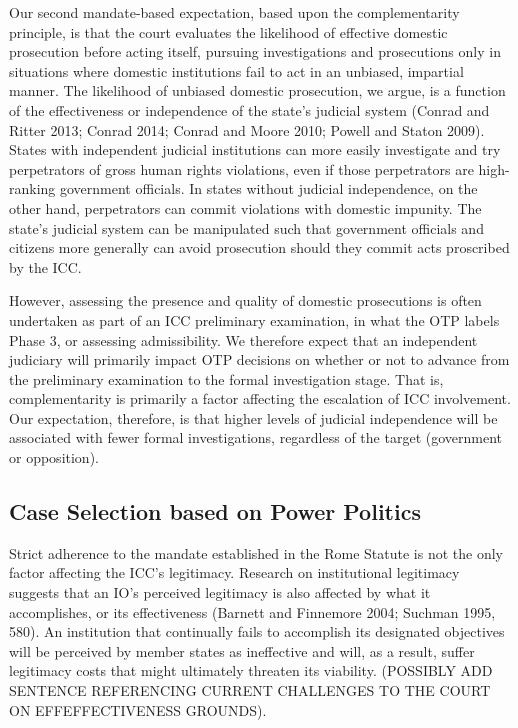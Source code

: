 Our second mandate-based expectation, based upon the complementarity principle, is that the court evaluates the likelihood of effective domestic prosecution before acting itself, pursuing investigations and prosecutions only in situations where domestic institutions fail to act in an unbiased, impartial manner. The likelihood of unbiased domestic prosecution, we argue, is a function of the effectiveness or independence of the state's judicial system (Conrad and Ritter 2013; Conrad 2014; Conrad and Moore 2010; Powell and Staton 2009). States with independent judicial institutions can more easily investigate and try perpetrators of gross human rights violations, even if those perpetrators are high-ranking government officials. In states without judicial independence, on the other hand, perpetrators can commit violations with domestic impunity. The state's judicial system can be manipulated such that government officials and citizens more generally can avoid prosecution should they commit acts proscribed by the ICC.  

However, assessing the presence and quality of domestic prosecutions is often undertaken as part of an ICC preliminary examination, in what the OTP labels Phase 3, or assessing admissibility.  We therefore expect that an independent judiciary will primarily impact OTP decisions on whether or not to advance from the preliminary examination to the formal investigation stage.  That is, complementarity is primarily a factor affecting the escalation of ICC involvement.  Our expectation, therefore, is that higher levels of judicial independence will be associated with fewer formal investigations, regardless of the target (government or opposition). 

\subsection*{Case Selection based on Power Politics}

Strict adherence to the mandate established in the Rome Statute is not the only factor affecting the ICC's legitimacy.  Research on institutional legitimacy suggests that an IO's perceived legitimacy is also affected by what it accomplishes, or its effectiveness (Barnett and Finnemore 2004; Suchman 1995, 580).  An institution that continually fails to accomplish its designated objectives will be perceived by member states as ineffective and will, as a result, suffer legitimacy costs that might ultimately threaten its viability.  (POSSIBLY ADD SENTENCE REFERENCING CURRENT CHALLENGES TO THE COURT ON EFFEFFECTIVENESS GROUNDS).  

